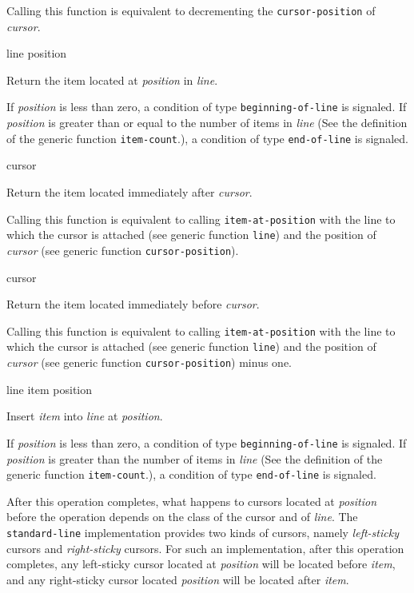 \ifdetached{}

Calling this function is equivalent to decrementing the
\texttt{cursor-position} of \textit{cursor}.  \howeverperformance{}

 {line position}

Return the item located at \textit{position} in \textit{line}.

If \textit{position} is less than zero, a condition of type
\texttt{beginning-of-line} is signaled.  If \textit{position} is
greater than or equal to the number of items in \textit{line} (See the
definition of the generic function \texttt{item-count}.), a condition
of type \texttt{end-of-line} is signaled.

 {cursor}

Return the item located immediately after \textit{cursor}.

\ifdetached{}

Calling this function is equivalent to calling
\texttt{item-at-position} with the line to which the cursor is
attached (see generic function \texttt{line}) and the position of
\textit{cursor} (see generic function \texttt{cursor-position}).
\howeverperformance{}

 {cursor}

Return the item located immediately before \textit{cursor}.

\ifdetached{}

Calling this function is equivalent to calling
\texttt{item-at-position} with the line to which the cursor is
attached (see generic function \texttt{line}) and the position of
\textit{cursor} (see generic function \texttt{cursor-position}) minus
one.  \howeverperformance{}

 {line item position}

Insert \textit{item} into \textit{line} at \textit{position}.

If \textit{position} is less than zero, a condition of type
\texttt{beginning-of-line} is signaled.  If \textit{position} is
greater than the number of items in \textit{line} (See the definition
of the generic function \texttt{item-count}.), a condition of type
\texttt{end-of-line} is signaled.

After this operation completes, what happens to cursors located at
\textit{position} before the operation depends on the class of the
cursor and of \textit{line}.  The \texttt{standard-line}
implementation provides two kinds of cursors, namely
\emph{left-sticky} cursors and \emph{right-sticky} cursors.  For such
an implementation, after this operation completes, any left-sticky
cursor located at \textit{position} will be located before
\textit{item}, and any right-sticky cursor located \textit{position}
will be located after \textit{item}.


